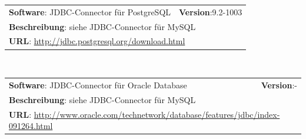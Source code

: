 \begin{tabular}{p{10cm}r}
\textbf{Software}: JDBC-Connector für PostgreSQL  & \textbf{Version}:9.2-1003\\
\multicolumn{2}{p{1\textwidth}}{\textbf{Beschreibung}: siehe JDBC-Connector für MySQL}\\
\multicolumn{2}{l}{\textbf{URL}: \url{http://jdbc.postgresql.org/download.html}}
\end{tabular}\\

\begin{tabular}{p{10cm}r}
\textbf{Software}: JDBC-Connector für Oracle Database & \textbf{Version}:-\\
\multicolumn{2}{p{1\textwidth}}{\textbf{Beschreibung}: siehe JDBC-Connector für MySQL}\\
\multicolumn{2}{l}{\textbf{URL}: \url{http://www.oracle.com/technetwork/database/features/jdbc/index-091264.html}}
\end{tabular}\\